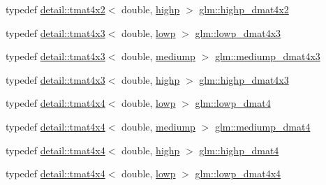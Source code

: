 \begin{DoxyCompactItemize}
typedef \hyperlink{structglm_1_1detail_1_1tmat4x2}{detail\+::tmat4x2}$<$ double, \hyperlink{namespaceglm_a0f04f086094c747d227af4425893f545ac6f7eab42eacbb10d59a58e95e362074}{highp} $>$ \hyperlink{group__core__precision_gaa4fb1ed350a6cd053abb9b093d13ce0d}{glm\+::highp\+\_\+dmat4x2}
\item 
typedef \hyperlink{structglm_1_1detail_1_1tmat4x3}{detail\+::tmat4x3}$<$ double, \hyperlink{namespaceglm_a0f04f086094c747d227af4425893f545ae161af3fc695e696ce3bf69f7332bc2d}{lowp} $>$ \hyperlink{group__core__precision_gabc1be51eb0cae7cd4b1d6483a954c35d}{glm\+::lowp\+\_\+dmat4x3}
\item 
typedef \hyperlink{structglm_1_1detail_1_1tmat4x3}{detail\+::tmat4x3}$<$ double, \hyperlink{namespaceglm_a0f04f086094c747d227af4425893f545a6416f3ea0c9025fb21ed50c4d6620482}{mediump} $>$ \hyperlink{group__core__precision_gafa1ba33d2748737129cde471fedbf9c5}{glm\+::mediump\+\_\+dmat4x3}
\item 
typedef \hyperlink{structglm_1_1detail_1_1tmat4x3}{detail\+::tmat4x3}$<$ double, \hyperlink{namespaceglm_a0f04f086094c747d227af4425893f545ac6f7eab42eacbb10d59a58e95e362074}{highp} $>$ \hyperlink{group__core__precision_gaf8aeba0eecc5c651e0f06414b6e37754}{glm\+::highp\+\_\+dmat4x3}
\item 
typedef \hyperlink{structglm_1_1detail_1_1tmat4x4}{detail\+::tmat4x4}$<$ double, \hyperlink{namespaceglm_a0f04f086094c747d227af4425893f545ae161af3fc695e696ce3bf69f7332bc2d}{lowp} $>$ \hyperlink{group__core__precision_gaea69794db4e619881b77d37bf84b337e}{glm\+::lowp\+\_\+dmat4}
\item 
typedef \hyperlink{structglm_1_1detail_1_1tmat4x4}{detail\+::tmat4x4}$<$ double, \hyperlink{namespaceglm_a0f04f086094c747d227af4425893f545a6416f3ea0c9025fb21ed50c4d6620482}{mediump} $>$ \hyperlink{group__core__precision_ga73de517f040f7d50746bbe273a396685}{glm\+::mediump\+\_\+dmat4}
\item 
typedef \hyperlink{structglm_1_1detail_1_1tmat4x4}{detail\+::tmat4x4}$<$ double, \hyperlink{namespaceglm_a0f04f086094c747d227af4425893f545ac6f7eab42eacbb10d59a58e95e362074}{highp} $>$ \hyperlink{group__core__precision_ga9a5d95e476d451d28d3939ac7f124baf}{glm\+::highp\+\_\+dmat4}
\item 
typedef \hyperlink{structglm_1_1detail_1_1tmat4x4}{detail\+::tmat4x4}$<$ double, \hyperlink{namespaceglm_a0f04f086094c747d227af4425893f545ae161af3fc695e696ce3bf69f7332bc2d}{lowp} $>$ \hyperlink{group__core__precision_gac762dec40f53114dfe6894499a2c9a79}{glm\+::lowp\+\_\+dmat4x4}
\item 

\end{DoxyCompactItemize}
